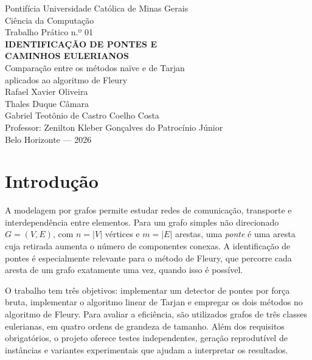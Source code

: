 \documentclass[12pt,a4paper]{article}
\begin{document}
\begin{titlepage}
  \begin{center}
    {\large Pontifícia Universidade Católica de Minas Gerais}\\[1cm]
    {\large Ciência da Computação}\\[3.8cm]

    {\large Trabalho Prático n.º 01}\\[0.7cm]

    {\bfseries\LARGE IDENTIFICAÇÃO DE PONTES E\\[0.3cm]
    CAMINHOS EULERIANOS}\\[0.9cm]

    {\large Comparação entre os métodos naïve e de Tarjan\\
    aplicados ao algoritmo de Fleury}\\[3.4cm]

    {\large Rafael Xavier Oliveira}\\[0.3cm]
    {\large Thales Duque Câmara}\\[0.3cm]
    {\large Gabriel Teotônio de Castro Coelho Costa}\\[0.7cm]
    {\large Professor: Zenilton Kleber Gonçalves do Patrocínio Júnior}\\[2.2cm]

    {\large Belo Horizonte --- 2026}
  \end{center}
\end{titlepage}

\section{Introdução}
A modelagem por grafos permite estudar redes de comunicação, transporte e
interdependência entre elementos. Para um grafo simples não direcionado
$G=(V,E)$, com $n=|V|$ vértices e $m=|E|$ arestas, uma \emph{ponte} é uma
aresta cuja retirada aumenta o número de componentes conexas.
A identificação de pontes é especialmente relevante para o método de Fleury,
que percorre cada aresta de um grafo exatamente uma vez, quando isso é possível.

O trabalho tem três objetivos: implementar um detector de pontes por força
bruta, implementar o algoritmo linear de Tarjan e empregar os dois métodos
no algoritmo de Fleury. Para avaliar a eficiência, são utilizados grafos de
três classes eulerianas, em quatro ordens de grandeza de tamanho.
Além dos requisitos obrigatórios, o projeto oferece testes independentes,
geração reprodutível de instâncias e variantes experimentais que ajudam a
interpretar os resultados.
\end{document}
